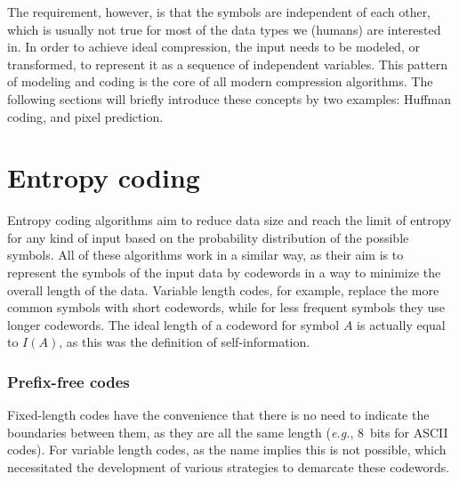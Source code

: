       The requirement, however, is that the symbols are independent of each other, which is usually not true for most of the data types we (humans) are interested in. In order to achieve ideal compression, the input needs to be modeled, or transformed, to represent it as a sequence of independent variables. This pattern of modeling and coding \cite{rissanen_universal_1981} is the core of all modern compression algorithms. 
      The following sections will briefly introduce these concepts by two examples: Huffman coding, and pixel prediction.
      
      
    \section{Entropy coding}
      \label{sec:entropyCoding}

      Entropy coding algorithms aim to reduce data size and reach the limit of entropy for any kind of input based on the probability distribution of the possible symbols. All of these algorithms work in a similar way, as their aim is to represent the symbols of the input data by codewords in a way to minimize the overall length of the data. Variable length codes, for example, replace the more common symbols with short codewords, while for less frequent symbols they use longer codewords. The ideal length of a codeword for symbol $A$ is actually equal to $I(A)$, as this was the definition of self-information.


      \subsubsection{Prefix-free codes}

      Fixed-length codes have the convenience that there is no need to indicate the boundaries between them, as they are all the same length (\textit{e.g.}, \SI{8}{bits} for ASCII codes). For variable length codes, as the name implies this is not possible, which necessitated the development of various strategies to demarcate these codewords. 


